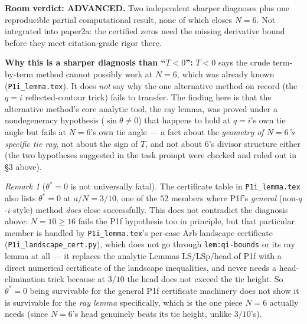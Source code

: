 \documentclass[11pt]{article}
\theoremstyle{plain}
\theoremstyle{remark}
\newtheorem{remark}{Remark}
\begin{document}
\textbf{Room verdict: ADVANCED.} Two independent sharper diagnoses plus one reproducible partial
computational result, none of which closes $N=6$. Not integrated into paper2a: the certified zeros
need the missing derivative bound before they meet citation-grade rigor there.


\textbf{Why this is a sharper diagnosis than ``$T<0$'':} $T<0$ says the crude term-by-term method cannot
possibly work at $N=6$, which was already known (\texttt{P1i\_lemma.tex}). It does \emph{not} say why the
one alternative method on record (the $q=i$ reflected-contour trick) fails to transfer. The finding here
is that the alternative method's core analytic tool, the ray lemma, was proved under a nondegeneracy
hypothesis ($\sin\theta\ne0$) that happens to hold at $q=i$'s own tie angle but fails at $N=6$'s own tie
angle --- a fact about the \emph{geometry of $N=6$'s specific tie ray}, not about the sign of $T$, and not
about $6$'s divisor structure either (the two hypotheses suggested in the task prompt were checked and
ruled out in \S3 above).

\begin{remark}[$\theta^\ast=0$ is not universally fatal]
The certificate table in \texttt{P1i\_lemma.tex} also lists $\theta^\ast=0$ at $a/N=3/10$, one of the $52$
members where P1f's \emph{general} (non-$q$-$i$-style) method \emph{does} close successfully. This does
not contradict the diagnosis above: $N=10\ge16$ fails the P1f hypothesis too in principle, but that
particular member is handled by \texttt{P1i\_lemma.tex}'s per-case Arb landscape certificate
(\texttt{P1i\_landscape\_cert.py}), which does not go through \texttt{lem:qi-bounds} or its ray lemma at
all --- it replaces the analytic Lemmas LS/LSp/head of P1f with a direct numerical certificate of the
landscape inequalities, and never needs a head-elimination trick because at $3/10$ the head does not
exceed the tie height. So $\theta^\ast=0$ being survivable for the general P1f certificate machinery does
not show it is survivable for the \emph{ray lemma} specifically, which is the one piece $N=6$ actually
needs (since $N=6$'s head genuinely beats its tie height, unlike $3/10$'s).
\end{remark}
\end{document}
